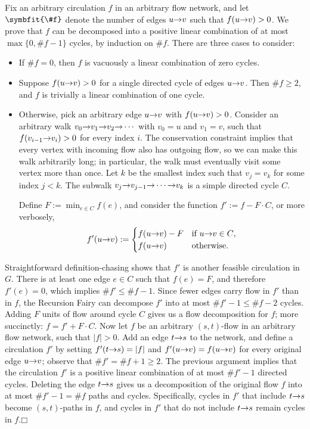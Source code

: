 \noindent Fix an arbitrary circulation $f$ in an arbitrary flow network, and let $\symbfit{\#f}$ denote the number of edges $u\mathord{\rightarrow}v$ such that $f(u\mathord{\rightarrow}v) > 0$.
We prove that $f$ can be decomposed into a positive linear combination of at most $\max\{0, \#f - 1\}$ cycles, by induction on $\#f$.
There are three cases to consider:
\begin{itemize}
\item If $\#f = 0$, then $f$ is vacuously a linear combination of zero cycles.
\item Suppose $f(u\mathord{\rightarrow}v) > 0$ for a single directed cycle of edges $u\mathord{\rightarrow}v$.
Then $\#f \ge 2$, and $f$ is trivially a linear combination of one cycle.
\item Otherwise, pick an arbitrary edge $u\mathord{\rightarrow}v$ with $f(u\mathord{\rightarrow}v) > 0$.
Consider an arbitrary walk $v_0\mathord{\rightarrow}v_1\mathord{\rightarrow}v_2\mathord{\rightarrow}\cdots$ with $v_0 = u$ and $v_1 = v$, such that $f(v_{i-1}\mathord{\rightarrow}v_i) > 0$ for every index $i$.
The conservation constraint implies that every vertex with incoming flow also has outgoing flow, so we can make this walk arbitrarily long; in particular, the walk must eventually visit some vertex more than once.
Let $k$ be the smallest index such that $v_j = v_k$ for some index $j < k$.
The subwalk $v_j\mathord{\rightarrow}v_{j-1}\mathord{\rightarrow}\cdots\mathord{\rightarrow}v_k$ is a simple directed cycle $C$.

Define $F := \min_{e \in C} f(e)$, and consider the function $f' := f - F \cdot C$, or more verbosely,
\[
f'(u\mathord{\rightarrow}v) :=
\begin{cases}
f(u\mathord{\rightarrow}v) - F & \text{if $u\mathord{\rightarrow}v \in C$,}\\
f(u\mathord{\rightarrow}v) & \text{otherwise.}
\end{cases}
\]
\end{itemize}
\noindent Straightforward definition-chasing shows that $f'$ is another feasible circulation in $G$.
There is at least one edge $e \in C$ such that $f(e) = F$, and therefore $f'(e) = 0$, which implies $\#f' \le \#f - 1$.
Since fewer edges carry flow in $f'$ than in $f$, the Recursion Fairy can decompose $f'$ into at most $\#f' - 1 \le \#f - 2$ cycles.
Adding $F$ units of flow around cycle $C$ gives us a flow decomposition for $f$; more succinctly: $f = f' + F \cdot C$.
Now let $f$ be an arbitrary $(s,t)$-flow in an arbitrary flow network, such that $|f| > 0$.
Add an edge $t\mathord{\rightarrow}s$ to the network, and define a circulation $f'$ by setting $f'(t\mathord{\rightarrow}s) = |f|$ and $f'(u\mathord{\rightarrow}v) = f(u\mathord{\rightarrow}v)$ for every original edge $u\mathord{\rightarrow}v$; observe that $\#f' = \#f + 1 \ge 2$.
The previous argument implies that the circulation $f'$ is a positive linear combination of at most $\#f' - 1$ directed cycles.
Deleting the edge $t\mathord{\rightarrow}s$ gives us a decomposition of the original flow $f$ into at most $\#f' - 1 = \#f$ paths and cycles.
Specifically, cycles in $f'$ that include $t\mathord{\rightarrow}s$ become $(s,t)$-paths in $f$, and cycles in $f'$ that do not include $t\mathord{\rightarrow}s$ remain cycles in $f$.\hfill$\mdlgwhtsquare$

